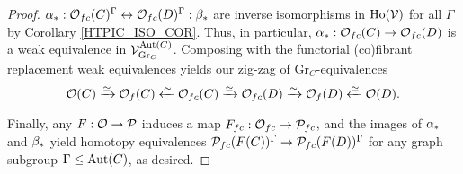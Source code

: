 \documentclass[a4paper,10pt
,draft
]{article}%
\renewcommand{\1}{\eta}%
\begin{document}
\begin{proof}
      $\alpha_{\**}: \O_{f c}(C)^\Gamma \leftrightarrow \O_{f c}(D)^\Gamma : \beta_{\**}$ are inverse isomorphisms in $\Ho(\V)$ for all $\Gamma$
      by Corollary \ref{HTPIC_ISO_COR}.
      Thus, in particular, $\alpha_{\**}: \O_{f c}(C) \to \O_{f c}(D)$ is a weak equivalence in $\V^{\Aut(C)}_{\mathrm{Gr}_C}$.
      Composing with the functorial (co)fibrant replacement weak equivalences yields our zig-zag of $\mathrm{Gr}_C$-equivalences
      \begin{equation}
            \O(C) \xrightarrow{\simeq} \O_f(C) \xleftarrow{\sim} \O_{f c}(C)
            \xrightarrow{\simeq}
            \O_{f c}(D) \xrightarrow{\sim} \O_f(D) \xleftarrow{\simeq} \O(D).
      \end{equation}
      
      Finally, any $F: \O \to \P$ induces a map $F_{f c}: \O_{f c} \to \P_{f c}$, and
      the images of $\alpha_{\**}$ and $\beta_{\**}$ yield
      homotopy equivalences $\P_{f c}(F(C))^\Gamma \to \P_{f c}(F(D))^\Gamma$ for any graph subgroup $\Gamma \leq \Aut(C)$,
      as desired.
\end{proof}
\end{document}
